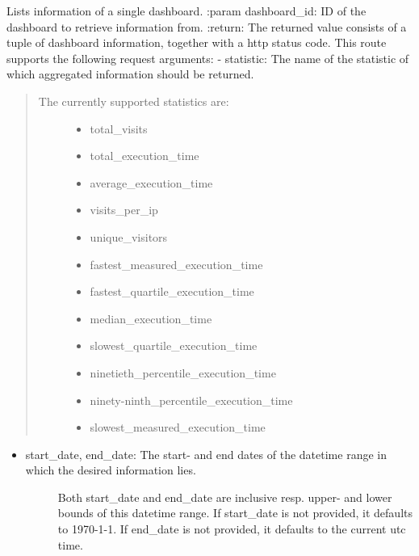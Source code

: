 \documentclass[letterpaper,10pt,english]{sphinxmanual}
\begin{document}
\begin{fulllineitems}
\label{\detokenize{pydash_web.controller.dashboards:pydash_web.controller.dashboards.dashboard}}
Lists information of a single dashboard.
:param dashboard\_id: ID of the dashboard to retrieve information from.
:return: The returned value consists of a tuple of dashboard information, together with a http status code.
This route supports the following request arguments:
- statistic: The name of the statistic of which aggregated information should be returned.
\begin{quote}
\begin{description}
\item[{The currently supported statistics are:}] \leavevmode\begin{itemize}
\item {} 
total\_visits

\item {} 
total\_execution\_time

\item {} 
average\_execution\_time

\item {} 
visits\_per\_ip

\item {} 
unique\_visitors

\item {} 
fastest\_measured\_execution\_time

\item {} 
fastest\_quartile\_execution\_time

\item {} 
median\_execution\_time

\item {} 
slowest\_quartile\_execution\_time

\item {} 
ninetieth\_percentile\_execution\_time

\item {} 
ninety-ninth\_percentile\_execution\_time

\item {} 
slowest\_measured\_execution\_time

\end{itemize}

\end{description}
\end{quote}
\begin{itemize}
\item {} \begin{description}
\item[{start\_date, end\_date: The start- and end dates of the datetime range in which the desired information lies.}] \leavevmode
Both start\_date and end\_date are inclusive resp. upper- and lower bounds of this datetime range.
If start\_date is not provided, it defaults to 1970-1-1.
If end\_date is not provided, it defaults to the current utc time.


\end{description}
\end{itemize}
\end{fulllineitems}
\end{document}
